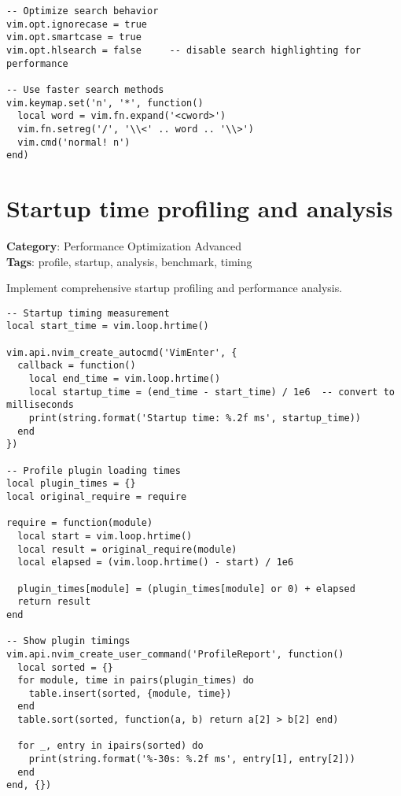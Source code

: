 {{{{{{{{{{\begin{Exa*}{}
\begin{Verbatim}[fontsize=\footnotesize, breaklines, breakanywhere]
-- Optimize search behavior
vim.opt.ignorecase = true
vim.opt.smartcase = true
vim.opt.hlsearch = false     -- disable search highlighting for performance

-- Use faster search methods
vim.keymap.set('n', '*', function()
  local word = vim.fn.expand('<cword>')
  vim.fn.setreg('/', '\\<' .. word .. '\\>')
  vim.cmd('normal! n')
end)
\end{Verbatim}
\end{Exa*}

\section{Startup time profiling and analysis}

\textbf{Category}: Performance Optimization Advanced\\ \textbf{Tags}: profile, startup, analysis, benchmark, timing
\vspace{0.5cm}

Implement comprehensive startup profiling and performance analysis.

\begin{Exa*}{}
\begin{Verbatim}[fontsize=\footnotesize, breaklines, breakanywhere]
-- Startup timing measurement
local start_time = vim.loop.hrtime()

vim.api.nvim_create_autocmd('VimEnter', {
  callback = function()
    local end_time = vim.loop.hrtime()
    local startup_time = (end_time - start_time) / 1e6  -- convert to milliseconds
    print(string.format('Startup time: %.2f ms', startup_time))
  end
})

-- Profile plugin loading times
local plugin_times = {}
local original_require = require

require = function(module)
  local start = vim.loop.hrtime()
  local result = original_require(module)
  local elapsed = (vim.loop.hrtime() - start) / 1e6
  
  plugin_times[module] = (plugin_times[module] or 0) + elapsed
  return result
end

-- Show plugin timings
vim.api.nvim_create_user_command('ProfileReport', function()
  local sorted = {}
  for module, time in pairs(plugin_times) do
    table.insert(sorted, {module, time})
  end
  table.sort(sorted, function(a, b) return a[2] > b[2] end)
  
  for _, entry in ipairs(sorted) do
    print(string.format('%-30s: %.2f ms', entry[1], entry[2]))
  end
end, {})
\end{Verbatim}
\end{Exa*}

}}}}}}}}}}
